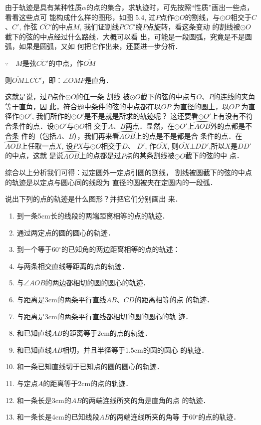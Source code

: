 \begin{solution}
    由于轨迹是具有某种性质$\alpha$的点的集合，求轨迹时，可先按照“性质”画出一些点，看看这些点可
能构成什么样的图形，如图
5.4, 过$P$点作$\odot O$的割线，与$\odot O$相交于$C$、$C'$, 作弦
$\overline{CC'}$的中点$M$, 我们证割线$PCC'$绕$P$点旋转，看这条变动
的割线被$\odot O$截下的弦的中点经过什么路线．大概可以看
出，可能是一段圆弧，究竟是不是圆弧，如果是圆弧，又如
何把它作出来，还要进一步分析．

$\because\quad M$是弦$\overline{CC'}$的中点，作$\overline{OM}$

则$\overline{OM}\bot\overline{CC'}$，即：$\angle OMP$是直角．

这就是说，过$P$点作$\odot O$的任一条 割线
被$\odot O$截下的弦的中点与$O$、$P$的连线的夹角等于直角，因
此，符合题中条件的弦的中点都在以$\overline{OP}$
为直径的圆上，以$\overline{OP}$
为直径作$\odot O'$, 我们所作的$\odot O'$是不是就是所求的轨迹呢？
这还要看$\odot O'$上有没有不符合条件的点．设$\odot O'$与$\odot O$相
交于$A$、$B$两点．显然，在$\odot O'$上$\wideparen{AOB}$外的点都是不合条
件的（包括$A$、$B$），我们再来看$\wideparen{AOB}$上的点是不是都是合
条件的点．在
$\wideparen{AOB}$上任取一点$X$, 设$PX$与$\odot O$相交于$D$、
$D'$, 作$\overline{OX}$, 则$\overline{OX}\bot \overline{DD'}$,所以$X$是$\overline{DD'}$的中点，这就
是说$\wideparen{AOB}$上的点都是过$P$点的某条割线被$\odot O$截下的弦的中
点．
\end{solution}

综合以上分析我们可得：过定圆外一定点引圆的割线，
割线被圆截下的弦的中点的轨迹是以定点与圆心间的线段为
直径的圆被夹在定圆内的一段弧．

\begin{ex}
    说出下列的点的轨迹是什么图形？并把它们分别画出
来．
\begin{enumerate}
    \item 到一条5cm长的线段的两端距离相等的点的轨迹．
    \item 通过两定点的圆的圆心的轨迹．
    \item 到一个等于60$^{\circ}$的已知角的两边距离相等的点的轨述：
    \item 与两条相交直线等距离的点的轨迹．
    \item 与$\angle AOB$的两边都相切的圆的圆心的轨迹．
    \item 与距离是3cm的两条平行直线$AB$、$CD$的距离相等的点
的轨迹．
\item 与距离是3cm的两条平行直线都相切的圆的圆心的轨
迹．
\item 和已知直线$AB$的距离等于2cm的点的轨迹．
\item 和已知直线$AB$相切，并且半径等于1.5cm的圆的圆心
的轨迹．
   \item 和一条已知直线切于已知点的圆的圆心的轨迹．
\item 与定点$A$的距离等于2cm的点的轨迹．
\item 和一条长是3cm的$AB$的两端连线所夹的角是直角的点
的轨迹．
\item 和一条长是4cm的已知线段$AB$的两端连线所夹的角等
于60$^{\circ}$的点的轨迹．

\end{enumerate}
\end{ex}



